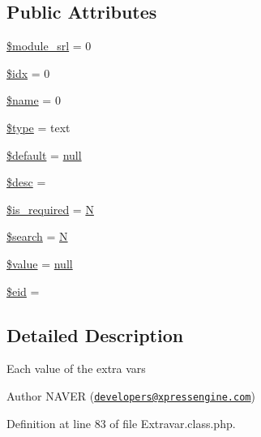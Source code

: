 \subsection*{Public Attributes}
\begin{DoxyCompactItemize}
\item 
\hyperlink{classExtraItem_a21cce86c0846b13228273314216e5ab9}{\$module\+\_\+srl} = 0
\item 
\hyperlink{classExtraItem_aadcda4aa903481b261d86bc50ab1c238}{\$idx} = 0
\item 
\hyperlink{classExtraItem_a32694a2408e9e2cca1d680356cf937d3}{\$name} = 0
\item 
\hyperlink{classExtraItem_ac965cc202d067c0449be9976045fd4be}{\$type} = \textquotesingle{}text\textquotesingle{}
\item 
\hyperlink{classExtraItem_a8499b54a8ec7aa3e3a40201d1458ffe5}{\$default} = \hyperlink{modernizr_8min_8js_a286f9ec831c5e676eeb493248eab9575}{null}
\item 
\hyperlink{classExtraItem_a47059cf3ac48f0d31c5358fa5e97f106}{\$desc} = \textquotesingle{}\textquotesingle{}
\item 
\hyperlink{classExtraItem_a616da9975ea87e9b61b6b9a2daf5e769}{\$is\+\_\+required} = \textquotesingle{}\hyperlink{jquery-1_8x_8min_8js_ab8a5cba0bbaa18ec7f830663874cb9d0}{N}\textquotesingle{}
\item 
\hyperlink{classExtraItem_a086e30bc8e2d078ad1108d00ae58a60c}{\$search} = \textquotesingle{}\hyperlink{jquery-1_8x_8min_8js_ab8a5cba0bbaa18ec7f830663874cb9d0}{N}\textquotesingle{}
\item 
\hyperlink{classExtraItem_a46622b49026acdfce833d5118a43986d}{\$value} = \hyperlink{modernizr_8min_8js_a286f9ec831c5e676eeb493248eab9575}{null}
\item 
\hyperlink{classExtraItem_a8a68f26bb602679ebf4095e774425092}{\$eid} = \textquotesingle{}\textquotesingle{}
\end{DoxyCompactItemize}


\subsection{Detailed Description}
Each value of the extra vars

\begin{DoxyAuthor}{Author}
N\+A\+V\+ER (\href{mailto:developers@xpressengine.com}{\tt developers@xpressengine.\+com}) 
\end{DoxyAuthor}


Definition at line 83 of file Extravar.\+class.\+php.



